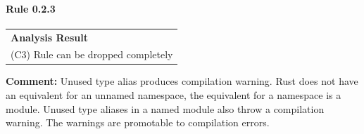 \paragraph{Rule 0.2.3}
\begin{longtable}{p{13cm}}
\textbf{Analysis Result} \\
(C3) Rule can be dropped completely \\
\end{longtable}
\textbf{Comment:} Unused type alias produces compilation warning. Rust does not have an equivalent for an unnamed namespace, the equivalent for a namespace is a module. Unused type aliases in a named module also throw a compilation warning. The warnings are promotable to compilation errors. \\


